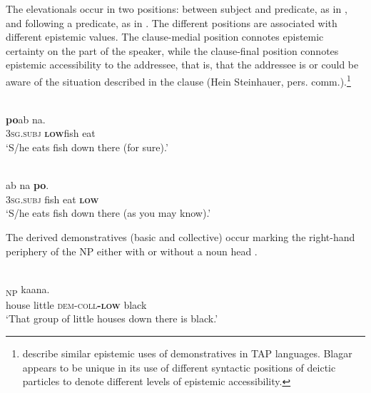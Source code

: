 The elevationals occur in two positions: between subject and predicate, as in , and following a predicate, as in . The different positions are associated with different epistemic values. The clause-medial position connotes epistemic certainty on the part of the speaker, while the clause-final position connotes epistemic accessibility to the addressee, that is, that the addressee is or could be aware of the situation described in the clause (Hein Steinhauer, pers. comm.).\footnote{\citet{SchapperEtAl2011} describe similar epistemic uses of demonstratives in TAP languages. Blagar appears to be unique in its use of different syntactic positions of deictic particles to denote different levels of epistemic accessibility.}  



\ea%
\label{ex:7:13}
 \\
 \textbf{{po}}{ab}    {na.} \\
    \textsc{3sg.subj} \textbf{\textsc{low}}fish  eat\\
\glt  `S/he eats fish down there (for sure).'
\z

 

 
\ea%
\label{ex:7:14}
 \\
  ab    na \textbf{{po}}{.}\\
  \textsc{3sg.subj} fish  eat  \textbf{\textsc{low}}   \\
\glt   `S/he eats fish down there (as you may know).'
\z
 


  





The derived demonstratives (basic and collective) occur marking the right-hand periphery of the NP either with  or without a noun head .



\ea%
\label{ex:7:15}
 \\
\textsubscript{NP} ka{\textglotstop}ana.\\
    house  little  \textsc{dem-coll}\textbf{\textsc{-low}} black \\
\glt `That group of little houses down there is black.'
\z

